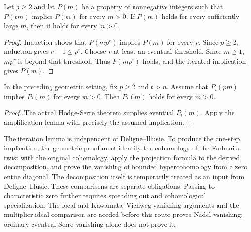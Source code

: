 \begin{lemma}
\label{lem:kn-frobenius-diagonal-iteration}
\leanok
Let $p\geq2$ and let $P(m)$ be a property of nonnegative integers
such that $P(pm)$ implies $P(m)$ for every $m>0$.  If $P(m)$ holds
for every sufficiently large $m$, then it holds for every $m>0$.
\end{lemma}
\begin{proof}
Induction shows that $P(mp^r)$ implies $P(m)$ for every $r$.  Since $p\geq2$,
induction gives $r+1\leq p^r$.  Choose $r$ at least an eventual
threshold.  Since $m\geq1$, $mp^r$ is beyond that threshold.
Thus $P(mp^r)$ holds, and the iterated implication gives $P(m)$.
\end{proof}

\begin{corollary}
\label{cor:kn-upper-diagonal-descent}
\leanok
In the preceding geometric setting, fix $p\geq2$ and $t>n$.
Assume that $P_t(pm)$ implies $P_t(m)$ for every $m>0$.
Then $P_t(m)$ holds for every $m>0$.
\end{corollary}
\begin{proof}
The actual Hodge-Serre theorem supplies eventual $P_t(m)$.
Apply the amplification lemma with precisely the assumed implication.
\end{proof}

\begin{remark}
\label{rmk:kn-geometric-frontier}
The iteration lemma is independent of Deligne--Illusie.  To
produce the one-step implication, the geometric proof must identify the cohomology
of the Frobenius twist with the original cohomology, apply the
projection formula to the derived decomposition, and prove the
vanishing of bounded hypercohomology from a zero entire diagonal.
The decomposition itself is temporarily treated as an input from
Deligne--Illusie.  These comparisons are separate obligations.
Passing to characteristic zero further requires spreading out and
cohomological specialization.  The local and Kawamata--Viehweg
vanishing arguments and the multiplier-ideal comparison are needed
before this route proves Nadel vanishing; ordinary eventual Serre
vanishing alone does not prove it.
\end{remark}
